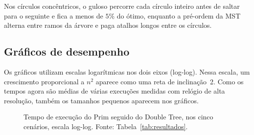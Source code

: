 \documentclass[11pt,a4paper]{article}
\renewcommand{\_}{\underscoreoriginal\allowbreak}
\begin{document}
Nos círculos concêntricos, o guloso percorre cada círculo inteiro antes
de saltar para o seguinte e fica a menos de $5\%$ do ótimo, enquanto a
pré-ordem da MST alterna entre ramos da árvore e paga atalhos longos
entre os círculos.

\subsection{Gráficos de desempenho}

Os gráficos utilizam escalas logarítmicas nos dois eixos (log-log).
Nessa escala, um crescimento proporcional a $n^2$ aparece como uma reta
de inclinação~2. Como os tempos agora são médias de várias execuções
medidas com relógio de alta resolução, também os tamanhos pequenos
aparecem nos gráficos.

\begin{figure}[H]
\centering
{}
\caption[Tempo de execução do Prim seguido do Double Tree]{Tempo de execução do Prim seguido do Double Tree, nos cinco cenários, escala log-log. Fonte: Tabela~\ref{tab:resultados}.}
\label{fig:dt}
\end{figure}
\end{document}
